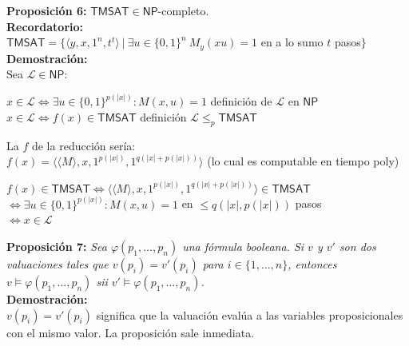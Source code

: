 \documentclass{article}
\begin{document}
\begin{flushleft}
  \textbf{Proposición 6:}
  $\mathsf{TMSAT} \in \mathsf{NP}$-completo. \\[0.5em]

  \textbf{\textcolor{OliveGreen}{Recordatorio:}} \\[0.5em]

  $\mathsf{TMSAT} = \{ \langle y,x,1^n,t^t \rangle \ | \ \exists u \in \{ 0,1 \}^n \ M_y(xu) = 1$ en a lo 
  sumo $t$ pasos$\}$ \\[0.5em]

  \textbf{\textcolor{Mulberry}{Demostración:}} \\[0.5em]

  Sea $\mathcal{L} \in \mathsf{NP}$:  
\end{flushleft}
\begin{center}
  $x \in \mathcal{L} \iff \exists u \in \{ 0,1 \}^{p(|x|)} : M(x,u) = 1$ \qquad \textcolor{OliveGreen}{
    definición de $\mathcal{L}$ en $\mathsf{NP}$} \\[0.5em]

  $x \in \mathcal{L} \iff f(x) \in \mathsf{TMSAT}$ \qquad \textcolor{OliveGreen}{definición $\mathcal{L} 
    \leq_p \mathsf{TMSAT}$}
\end{center}
\begin{flushleft}
  La $f$ de la reducción sería: \\[0.5em]

  \quad $f(x) = \langle \langle M \rangle ,x,1^{p(|x|)},1^{q(|x| + p(|x|))} \rangle$ \qquad \textcolor{
    OliveGreen}{(lo cual es computable en tiempo poly)}
\end{flushleft}
\begin{center}
  $f(x) \in \mathsf{TMSAT} \iff \langle \langle M \rangle ,x,1^{p(|x|)},1^{q(|x| + p(|x|))} \rangle \in 
  \mathsf{TMSAT}$ \\[0.5em]

  $\iff \exists u \in \{ 0,1 \}^{p(|x|)} : M(x,u) = 1$ en $\leq q(|x|, p(|x|))$ pasos \\[0.5em]

  $\iff x \in \mathcal{L}$
\end{center}

\begin{flushleft}
  \textbf{Proposición 7:}
  \textit{Sea $\varphi(p_1,\dots, p_n)$ una fórmula booleana. Si $v$ y $v'$ son dos valuaciones tales que
  $v(p_i) = v'(p_i)$ para $i \in \{ 1, \dots, n\}$, entonces $v \models \varphi(p_1,\dots, p_n)$ sii
  $v' \models \varphi(p_1,\dots, p_n)$.} \\[0.5em]

  \textbf{\textcolor{Mulberry}{Demostración:}} \\[0.5em]

  $v(p_i) = v'(p_i)$ significa que la valuación evalúa a las variables proposicionales con el mismo valor.
  La proposición sale inmediata.
\end{flushleft}
\end{document}
